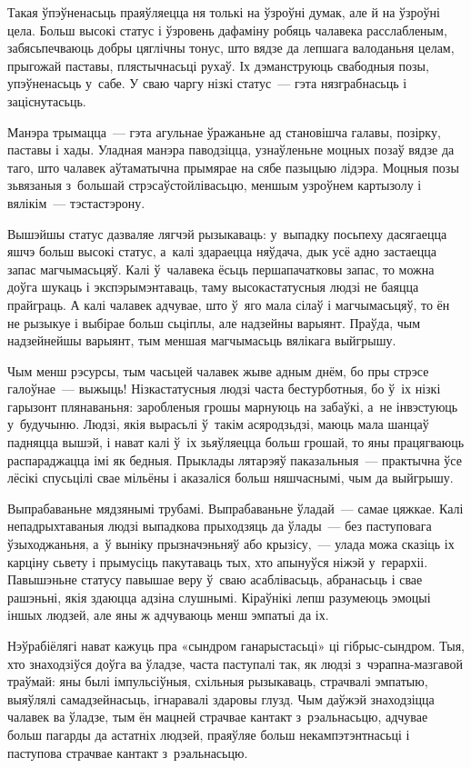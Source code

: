 Такая ўпэўненасьць праяўляецца ня толькі на ўзроўні думак, але й на ўзроўні цела. Больш высокі статус і ўзровень дафаміну робяць чалавека расслабленым, забясьпечваюць добры цяглічны тонус, што вядзе да лепшага валоданьня целам, прыгожай паставы, плястычнасьці рухаў. Іх дэманструюць свабодныя позы, упэўненасьць у~сабе. У сваю чаргу нізкі статус~--- гэта нязграбнасьць і заціснутасьць.

Манэра трымацца~--- гэта агульнае ўражаньне ад становішча галавы, позірку, паставы і хады. Уладная манэра паводзіцца, узнаўленьне моцных позаў вядзе да таго, што чалавек аўтаматычна прымярае на сябе пазыцыю лідэра. Моцныя позы зьвязаныя з~большай стрэсаўстойлівасьцю, меншым узроўнем картызолу і вялікім~--- тэстастэрону.

Вышэйшы статус дазваляе лягчэй рызыкаваць: у~выпадку посьпеху дасягаецца яшчэ больш высокі статус, а~калі здараецца няўдача, дык усё адно застаецца запас магчымасьцяў. Калі ў~чалавека ёсьць першапачатковы запас, то можна доўга шукаць і экспэрымэнтаваць, таму высокастатусныя людзі не баяцца прайграць. А калі чалавек адчувае, што ў~яго мала сілаў і магчымасьцяў, то ён не рызыкуе і выбірае больш сьціплы, але надзейны варыянт. Праўда, чым надзейнейшы варыянт, тым меншая магчымасьць вялікага выйгрышу.

Чым менш рэсурсы, тым часьцей чалавек жыве адным днём, бо пры стрэсе галоўнае~--- выжыць! Нізкастатусныя людзі часта бестурботныя, бо ў~іх нізкі гарызонт плянаваньня: заробленыя грошы марнуюць на забаўкі, а~не інвэстуюць у~будучыню. Людзі, якія вырасьлі ў~такім асяродзьдзі, маюць мала шанцаў падняцца вышэй, і нават калі ў~іх зьяўляецца больш грошай, то яны працягваюць распараджацца імі як бедныя. Прыклады лятарэяў паказальныя~--- практычна ўсе лёсікі спусьцілі свае мільёны і аказаліся больш няшчаснымі, чым да выйгрышу.

Выпрабаваньне мядзянымі трубамі. Выпрабаваньне ўладай~--- самае цяжкае. Калі непадрыхтаваныя людзі выпадкова прыходзяць да ўлады~--- без паступовага ўзыходжаньня, а~ў выніку прызначэньняў або крызісу,~--- улада можа сказіць іх карціну сьвету і прымусіць пакутаваць тых, хто апынуўся ніжэй у~герархіі. Павышэньне статусу павышае веру ў~сваю асаблівасьць, абранасьць і свае рашэньні, якія здаюцца адзіна слушнымі. Кіраўнікі лепш разумеюць эмоцыі іншых людзей, але яны ж адчуваюць менш эмпатыі да іх.

Нэўрабіёлягі нават кажуць пра «сындром ганарыстасьці» ці гібрыс-сындром. Тыя, хто знаходзіўся доўга ва ўладзе, часта паступалі так, як людзі з~чэрапна-мазгавой траўмай: яны былі імпульсіўныя, схільныя рызыкаваць, страчвалі эмпатыю, выяўлялі самадзейнасьць, ігнаравалі здаровы глузд. Чым даўжэй знаходзіцца чалавек ва ўладзе, тым ён мацней страчвае кантакт з~рэальнасьцю, адчувае больш пагарды да астатніх людзей, праяўляе больш некампэтэнтнасьці і паступова страчвае кантакт з~рэальнасьцю.

